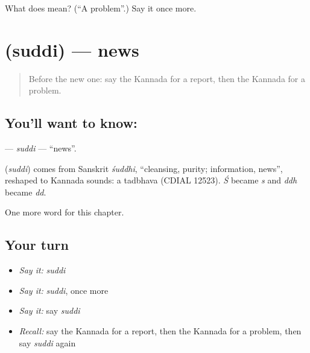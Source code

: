 \begin{tcolorbox}[breakable,colback=teal!4,colframe=teal!35!black,title={Before you move on}]
What does  mean? (\textquotedblleft{}A problem\textquotedblright{}.) Say it once more.
\end{tcolorbox}
\section[\texorpdfstring{\kn{ಸುದ್ದಿ} (suddi)}{ಸುದ್ದಿ (suddi)}]{ (suddi) — news}

\label{lesson:KA-C269-suddi}



\begin{quote}
Before the new one: say the Kannada for a report, then the Kannada for a problem.
\end{quote}

\subsection*{You'll want to know: }
\textbf{} — \emph{suddi} — \textquotedblleft{}news\textquotedblright{}.

\begin{cousinweb}
\textbf{} (\emph{suddi}) comes from Sanskrit \emph{śuddhi}, \textquotedblleft{}cleansing, purity; information, news\textquotedblright{}, reshaped to Kannada sounds: a tadbhava (CDIAL 12523). \emph{Ś} became \emph{s} and \emph{ddh} became \emph{dd}.
\end{cousinweb}

\begin{grammarlens}[title={What you've built}]
One more word for this chapter.
\end{grammarlens}

\subsection*{Your turn}
\begin{itemize}
\raggedright
  \item \emph{Say it:} \emph{suddi}
  \item \emph{Say it:} \emph{suddi}, once more
  \item \emph{Say it:} say \emph{suddi}
  \item \emph{Recall:} say the Kannada for a report, then the Kannada for a problem, then say \emph{suddi} again
\end{itemize}


